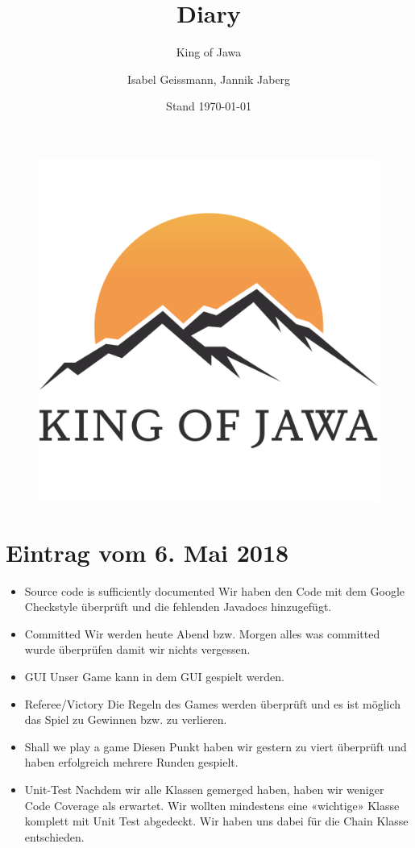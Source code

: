 \documentclass{scrartcl}
\title{Diary}
\subtitle{King of Jawa}
\author{Isabel Geissmann, Jannik Jaberg}
\date{Stand \today}
\newcommand{\n}{\newline}
\begin{document}
\maketitle
\begin{figure}[H]
	\includegraphics[width=\linewidth]{LOGO.png}
\end{figure}

\section*{Eintrag vom 6. Mai 2018}
\begin{itemize}
	\item Source code is sufficiently documented \n
	Wir haben den Code mit dem Google Checkstyle überprüft und die fehlenden Javadocs hinzugefügt.
	\item Committed \n
 	Wir werden heute Abend bzw. Morgen alles was committed wurde überprüfen damit wir nichts vergessen.
	\item GUI \n
	Unser Game kann in dem GUI gespielt werden.
	\item Referee/Victory \n
	Die Regeln des Games werden überprüft und es ist möglich das Spiel zu Gewinnen bzw. zu verlieren. 
	\item Shall we play a game \n
	Diesen Punkt haben wir gestern zu viert überprüft und haben erfolgreich mehrere Runden gespielt.
	\item Unit-Test \n
	Nachdem wir alle Klassen gemerged haben, haben wir weniger Code Coverage als erwartet. 
	Wir wollten mindestens eine «wichtige» Klasse komplett mit Unit Test abgedeckt. Wir haben uns dabei für die Chain Klasse entschieden. 
\end{itemize}
\end{document}
